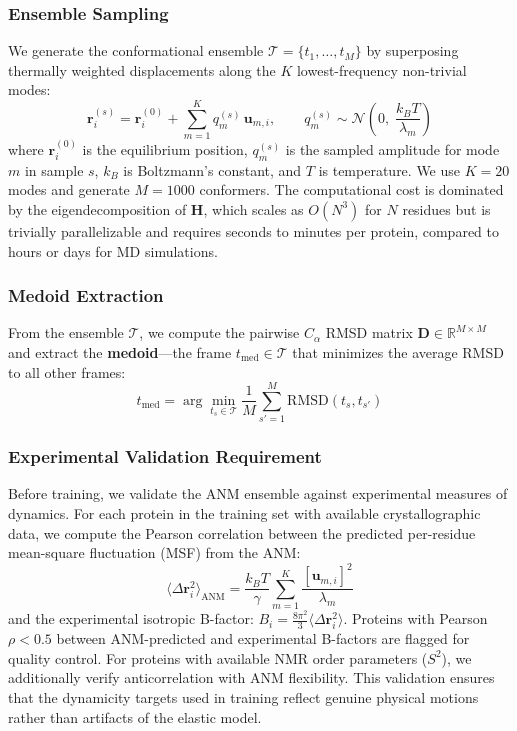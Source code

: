 \documentclass{article}
\begin{document}
\subsubsection{Ensemble Sampling}
We generate the conformational ensemble $\mathcal{T} = \{t_1, \ldots, t_M\}$ by superposing thermally weighted displacements along the $K$ lowest-frequency non-trivial modes:
\begin{equation}
    \mathbf{r}_i^{(s)} = \mathbf{r}_i^{(0)} + \sum_{m=1}^{K} q_m^{(s)} \, \mathbf{u}_{m,i}, \qquad q_m^{(s)} \sim \mathcal{N}\left(0, \; \frac{k_B T}{\lambda_m}\right)
\end{equation}
where $\mathbf{r}_i^{(0)}$ is the equilibrium position, $q_m^{(s)}$ is the sampled amplitude for mode $m$ in sample $s$, $k_B$ is Boltzmann's constant, and $T$ is temperature. We use $K = 20$ modes and generate $M = 1000$ conformers. The computational cost is dominated by the eigendecomposition of $\mathbf{H}$, which scales as $O(N^3)$ for $N$ residues but is trivially parallelizable and requires seconds to minutes per protein, compared to hours or days for MD simulations.

\subsubsection{Medoid Extraction}
From the ensemble $\mathcal{T}$, we compute the pairwise $C_\alpha$ RMSD matrix $\mathbf{D} \in \mathbb{R}^{M \times M}$ and extract the \textbf{medoid}---the frame $t_{\text{med}} \in \mathcal{T}$ that minimizes the average RMSD to all other frames:
\begin{equation}
    t_{\text{med}} = \arg\min_{t_s \in \mathcal{T}} \frac{1}{M} \sum_{s'=1}^{M} \text{RMSD}(t_s, t_{s'})
\end{equation}

\subsubsection{Experimental Validation Requirement}
Before training, we validate the ANM ensemble against experimental measures of dynamics. For each protein in the training set with available crystallographic data, we compute the Pearson correlation between the predicted per-residue mean-square fluctuation (MSF) from the ANM:
\begin{equation}
    \langle \Delta \mathbf{r}_i^2 \rangle_{\text{ANM}} = \frac{k_B T}{\gamma} \sum_{m=1}^{K} \frac{[\mathbf{u}_{m,i}]^2}{\lambda_m}
\end{equation}
and the experimental isotropic B-factor: $B_i = \frac{8\pi^2}{3} \langle \Delta \mathbf{r}_i^2 \rangle$. Proteins with Pearson $\rho < 0.5$ between ANM-predicted and experimental B-factors are flagged for quality control. For proteins with available NMR order parameters ($S^2$), we additionally verify anticorrelation with ANM flexibility. This validation ensures that the dynamicity targets used in training reflect genuine physical motions rather than artifacts of the elastic model.
\end{document}
